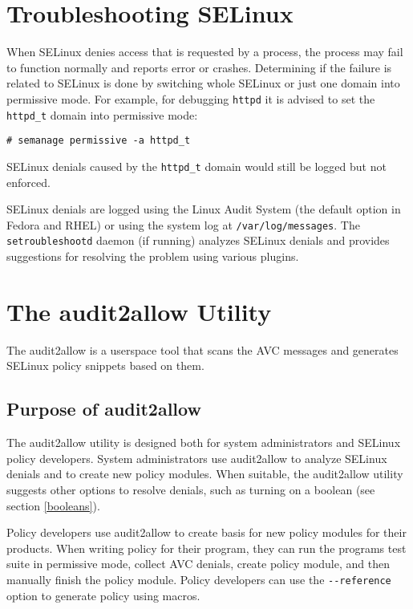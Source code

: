 \section{Troubleshooting SELinux}

When SELinux denies access that is requested by a process, the process may fail
to function normally and reports error or crashes. Determining if the failure is
related to SELinux is done by switching whole SELinux or just one domain into
permissive mode. For example, for debugging \texttt{httpd} it is advised to set
the \texttt{httpd\_t} domain into permissive mode:
\begin{lstlisting}
# semanage permissive -a httpd_t
\end{lstlisting}
SELinux denials caused by the \texttt{httpd\_t} domain would still be logged but
not enforced.

SELinux denials are logged using the Linux Audit System (the default option in
Fedora and RHEL) or using the system log at \texttt{/var/log/messages}. The
\texttt{setroubleshootd} daemon (if running) analyzes SELinux denials and
provides suggestions for resolving the problem using various plugins.

\section{The audit2allow Utility}
The audit2allow is a userspace tool that scans the AVC messages and generates
SELinux policy snippets based on them.

\subsection{Purpose of audit2allow}
The audit2allow utility is designed both for system administrators and SELinux
policy developers. System administrators use audit2allow to analyze SELinux
denials and to create new policy modules. When suitable, the audit2allow utility
suggests other options to resolve denials, such as turning on a boolean (see
section \ref{booleans}).

Policy developers use audit2allow to create basis for new policy modules for
their products. When writing policy for their program, they can run the
programs test suite in permissive mode, collect AVC denials, create policy
module, and then manually finish the policy module. Policy developers can use
the \texttt{-{}-reference} option to generate policy using macros.

